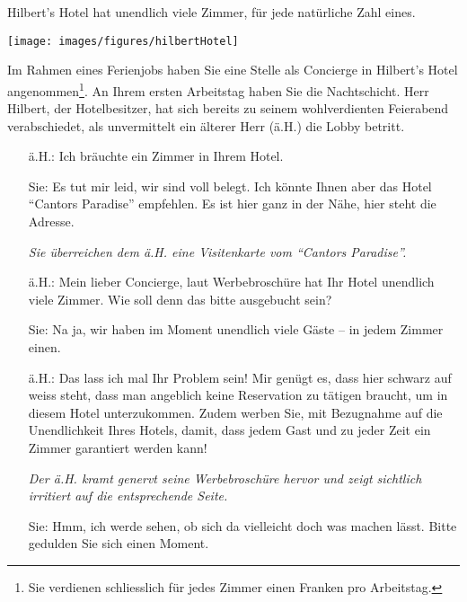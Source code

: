 \begin{bsp}
Hilbert's Hotel hat unendlich viele Zimmer, für jede natürliche Zahl eines.
\begin{center}
\begin{framed}
\texttt{[image: images/figures/hilbertHotel]}
\end{framed}
\end{center}
Im Rahmen eines Ferienjobs haben Sie eine Stelle als Concierge in Hilbert's Hotel angenommen\footnote{Sie verdienen schliesslich für jedes Zimmer einen Franken pro Arbeitstag.}. An Ihrem ersten Arbeitstag haben Sie die Nachtschicht. Herr Hilbert, der Hotelbesitzer, hat sich bereits zu seinem wohlverdienten Feierabend verabschiedet, als unvermittelt ein älterer Herr (ä.H.) die Lobby betritt.
\begin{itemize}
\item[ä.H.:] Ich bräuchte ein Zimmer in Ihrem Hotel.
\item[Sie:] Es tut mir leid, wir sind voll belegt. Ich könnte Ihnen aber das Hotel ``Cantors Paradise'' empfehlen. Es ist hier ganz in der Nähe, hier steht die Adresse.

\textit{Sie überreichen dem ä.H. eine Visitenkarte vom ``Cantors Paradise''.}
\item[ä.H.:] Mein lieber Concierge, laut Werbebroschüre hat Ihr Hotel unendlich viele Zimmer. Wie soll denn das bitte ausgebucht sein?
\item[Sie:] Na ja, wir haben im Moment unendlich viele Gäste -- in jedem Zimmer einen.
\item[ä.H.:] Das lass ich mal Ihr Problem sein! Mir genügt es, dass hier schwarz auf weiss steht, dass man angeblich keine Reservation zu tätigen braucht, um in diesem Hotel unterzukommen. Zudem werben Sie, mit Bezugnahme auf die Unendlichkeit Ihres Hotels, damit, dass jedem Gast und zu jeder Zeit ein Zimmer garantiert werden kann!

\textit{Der ä.H. kramt genervt seine Werbebroschüre hervor und zeigt sichtlich irritiert auf die entsprechende Seite.}
\item[Sie:] Hmm, ich werde sehen, ob sich da vielleicht doch was machen lässt. Bitte gedulden Sie sich einen Moment.


\end{itemize}
\end{bsp}
